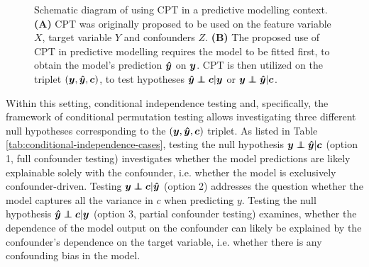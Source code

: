 \documentclass{article}
\begin{document}
\begin{figure}
{

    }
  \caption{Schematic diagram of using CPT in a predictive modelling context. \\ \textbf{(A)} CPT was originally proposed to be used on the feature variable $X$, target variable $Y$ and confounders $Z$. \textbf{(B)} The proposed use of CPT in predictive modelling requires the model to be fitted first, to obtain the model's prediction $\boldsymbol{\hat{y}}$ on $\boldsymbol{y}$. CPT is then utilized on the triplet $(\boldsymbol{y}, \boldsymbol{\hat{y}}, \boldsymbol{c})$, to test hypotheses $\yhat \independent \c | \y$ or $\y \independent \yhat | \c$.}
  \label{fig:schematic}
\end{figure}

Within this setting, conditional independence testing and, specifically, the framework of conditional permutation testing allows investigating three different null hypotheses corresponding to the $(\boldsymbol{y}, \boldsymbol{\hat{y}}, \boldsymbol{c})$ triplet. As listed in Table \ref{tab:conditional-independence-cases}, testing the null hypothesis $\y \independent \yhat | \c$ (option 1, full confounder testing) investigates whether the model predictions are likely explainable solely with the confounder, i.e. whether the model is exclusively confounder-driven. Testing $\y \independent \c | \yhat$ (option 2) addresses the question whether the model captures all the variance in $c$ when predicting $y$. Testing the null hypothesis $\yhat \independent \c | \y$ (option 3, partial confounder testing) examines, whether the dependence of the model output on the confounder can likely be explained by the confounder's dependence on the target variable, i.e. whether there is any confounding bias in the model.
\end{document}
